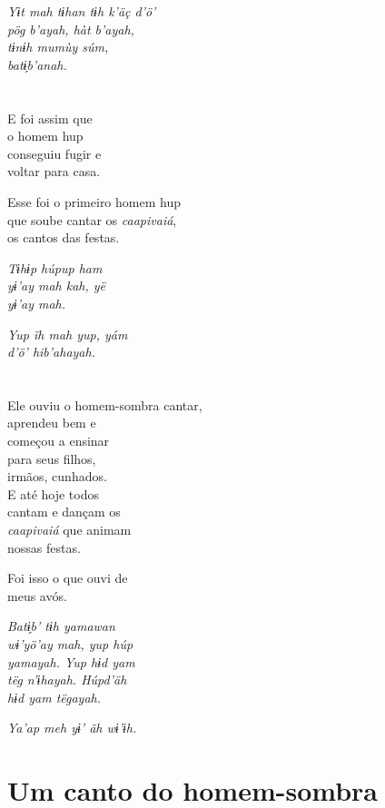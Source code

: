 \textit{Yɨt mah tɨhan tɨh k’äç d’ö’\\
pög b’ayah, hàt b’ayah,\\
tɨnɨh mumùy súm,\\
batɨ̗b’anah.}

\chapter{}

E foi assim que\\
o homem hup\\
conseguiu fugir e\\
voltar para casa.

Esse foi o primeiro homem hup\\
que soube cantar os \textit{caapivaiá},\\
os cantos das festas.

\textit{Tɨhɨp húpup ham\\
yɨ’ay mah kah, yë\\
yɨ’ay mah.}

\textit{Yup ĩh mah yup, yám\\
d’ö’ hib’ahayah.}

\chapter{}

Ele ouviu o homem-sombra cantar,\\
aprendeu bem e\\
começou a ensinar\\
para seus filhos,\\
irmãos, cunhados.\\
E até hoje todos\\
cantam e dançam os\\
\textit{caapivaiá} que animam\\
nossas festas.

Foi isso o que ouvi de\\
meus avós.

\textit{Batɨ̗b’ tɨh yamawan\\
wɨ’yö’ay mah, yup húp\\
yamayah. Yup hɨd yam\\
tëg n’ɨhayah. Húpd’äh\\
hɨd yam tëgayah.}

\textit{Ya’ap meh yɨ’ ãh wɨ’ɨh.}


\chapter{Um canto do homem-sombra}


